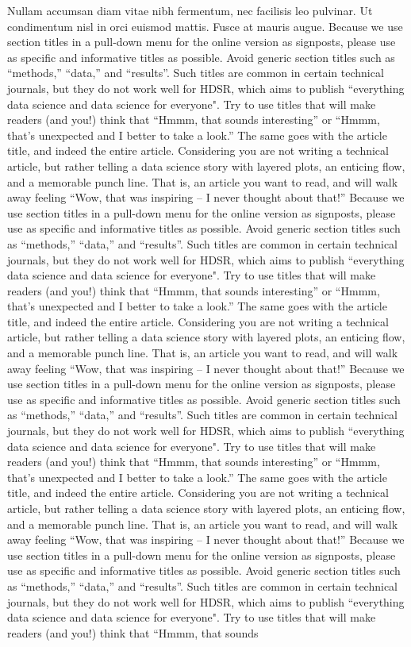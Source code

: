 \documentclass[]{hdsr}
\begin{document}
Nullam accumsan diam vitae nibh fermentum, nec facilisis leo pulvinar. Ut condimentum nisl in orci euismod mattis. Fusce at mauris augue. Because we use section titles in a pull-down menu for the online version as signposts, please use as specific and informative titles as possible. Avoid generic section titles such as ``methods,'' ``data,'' and ``results''. Such titles are common in certain technical journals, but they do not work well for HDSR, which aims to publish ``everything data science and data science for everyone". Try to use titles that will make readers (and you!) think that ``Hmmm, that sounds interesting'' or ``Hmmm, that's unexpected and I better to take a look.''   The same goes with the article title, and indeed the entire article.  Considering you are not writing a technical article, but rather telling a data science story with layered plots, an enticing flow, and a memorable punch line. That is, an article you want to read, and will walk away feeling ``Wow, that was inspiring -- I never thought about that!'' Because we use section titles in a pull-down menu for the online version as signposts, please use as specific and informative titles as possible. Avoid generic section titles such as ``methods,'' ``data,'' and ``results''. Such titles are common in certain technical journals, but they do not work well for HDSR, which aims to publish ``everything data science and data science for everyone". Try to use titles that will make readers (and you!) think that ``Hmmm, that sounds interesting'' or ``Hmmm, that's unexpected and I better to take a look.''   The same goes with the article title, and indeed the entire article.  Considering you are not writing a technical article, but rather telling a data science story with layered plots, an enticing flow, and a memorable punch line. That is, an article you want to read, and will walk away feeling ``Wow, that was inspiring -- I never thought about that!'' Because we use section titles in a pull-down menu for the online version as signposts, please use as specific and informative titles as possible. Avoid generic section titles such as ``methods,'' ``data,'' and ``results''. Such titles are common in certain technical journals, but they do not work well for HDSR, which aims to publish ``everything data science and data science for everyone". Try to use titles that will make readers (and you!) think that ``Hmmm, that sounds interesting'' or ``Hmmm, that's unexpected and I better to take a look.''   The same goes with the article title, and indeed the entire article.  Considering you are not writing a technical article, but rather telling a data science story with layered plots, an enticing flow, and a memorable punch line. That is, an article you want to read, and will walk away feeling ``Wow, that was inspiring -- I never thought about that!'' Because we use section titles in a pull-down menu for the online version as signposts, please use as specific and informative titles as possible. Avoid generic section titles such as ``methods,'' ``data,'' and ``results''. Such titles are common in certain technical journals, but they do not work well for HDSR, which aims to publish ``everything data science and data science for everyone". Try to use titles that will make readers (and you!) think that ``Hmmm, that sounds 
\end{document}
